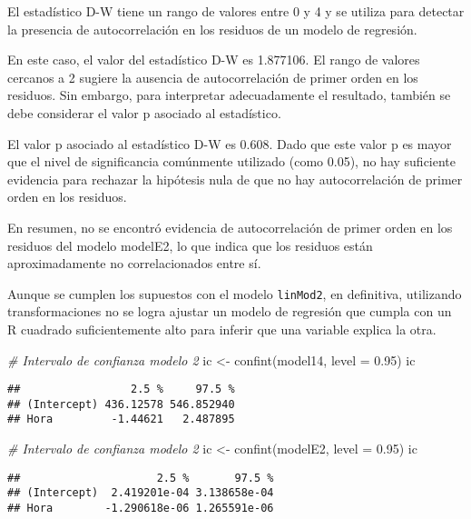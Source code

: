 \documentclass[
]{article}
\newenvironment{Shaded}{\begin{snugshade}}{\end{snugshade}}
\newcommand{\AttributeTok}[1]{\textcolor[rgb]{0.77,0.63,0.00}{#1}}
\newcommand{\CommentTok}[1]{\textcolor[rgb]{0.56,0.35,0.01}{\textit{#1}}}
\newcommand{\FloatTok}[1]{\textcolor[rgb]{0.00,0.00,0.81}{#1}}
\newcommand{\FunctionTok}[1]{\textcolor[rgb]{0.00,0.00,0.00}{#1}}
\newcommand{\NormalTok}[1]{#1}
\newcommand{\OtherTok}[1]{\textcolor[rgb]{0.56,0.35,0.01}{#1}}
\begin{document}
El estadístico D-W tiene un rango de valores entre 0 y 4 y se utiliza
para detectar la presencia de autocorrelación en los residuos de un
modelo de regresión.

En este caso, el valor del estadístico D-W es 1.877106. El rango de
valores cercanos a 2 sugiere la ausencia de autocorrelación de primer
orden en los residuos. Sin embargo, para interpretar adecuadamente el
resultado, también se debe considerar el valor p asociado al
estadístico.

El valor p asociado al estadístico D-W es 0.608. Dado que este valor p
es mayor que el nivel de significancia comúnmente utilizado (como 0.05),
no hay suficiente evidencia para rechazar la hipótesis nula de que no
hay autocorrelación de primer orden en los residuos.

En resumen, no se encontró evidencia de autocorrelación de primer orden
en los residuos del modelo modelE2, lo que indica que los residuos están
aproximadamente no correlacionados entre sí.

Aunque se cumplen los supuestos con el modelo \texttt{linMod2}, en
definitiva, utilizando transformaciones no se logra ajustar un modelo de
regresión que cumpla con un R cuadrado suficientemente alto para inferir
que una variable explica la otra.

\begin{Shaded}
\begin{Highlighting}[]
\CommentTok{\# Intervalo de confianza modelo 2}
\NormalTok{ic }\OtherTok{\textless{}{-}} \FunctionTok{confint}\NormalTok{(model14, }\AttributeTok{level =} \FloatTok{0.95}\NormalTok{)}
\NormalTok{ic}
\end{Highlighting}
\end{Shaded}

\begin{verbatim}
##                 2.5 %     97.5 %
## (Intercept) 436.12578 546.852940
## Hora         -1.44621   2.487895
\end{verbatim}

\begin{Shaded}
\begin{Highlighting}[]
\CommentTok{\# Intervalo de confianza modelo 2}
\NormalTok{ic }\OtherTok{\textless{}{-}} \FunctionTok{confint}\NormalTok{(modelE2, }\AttributeTok{level =} \FloatTok{0.95}\NormalTok{)}
\NormalTok{ic}
\end{Highlighting}
\end{Shaded}

\begin{verbatim}
##                     2.5 %       97.5 %
## (Intercept)  2.419201e-04 3.138658e-04
## Hora        -1.290618e-06 1.265591e-06
\end{verbatim}
\end{document}
